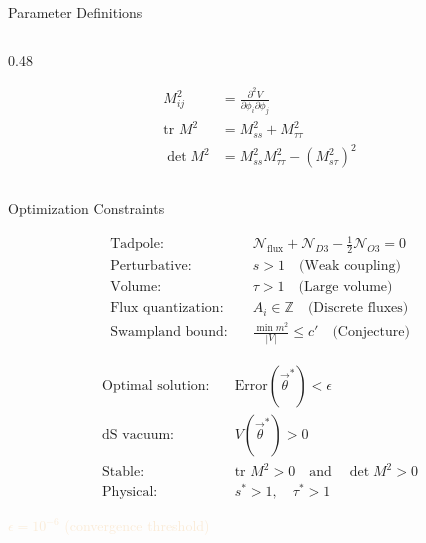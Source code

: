 \begin{frame}{Parameter Definitions}
\begin{columns}
\begin{column}{0.48\textwidth}
\vspace{0.3cm}

\begin{tcolorbox}[
    enhanced,
    colback=black!85,
    colframe=Red!80!white,
    arc=3mm,
    boxrule=1pt,
    title={\color{Yellow!80!white}Mass Matrix Components}
]
\begin{align*}
M^2_{ij} &= \frac{\partial^2 V}{\partial \phi_i \partial \phi_j} \\
\text{tr } M^2 &= M^2_{ss} + M^2_{\tau\tau} \\
\det M^2 &= M^2_{ss}M^2_{\tau\tau} - (M^2_{s\tau})^2
\end{align*}
\end{tcolorbox}
\end{column}
\end{columns}
\end{frame}

\begin{frame}{Optimization Constraints}
\blurbackground
\begin{tcolorbox}[
    enhanced,
    colback=black!85,
    colframe=Yellow!80!white,
    arc=3mm,
    boxrule=1.5pt,
    title={\color{mypurple}Physical Constraints}
]
\begin{align*}
\text{Tadpole:} \quad & \mathcal{N}_{\text{flux}} + \mathcal{N}_{D3} - \frac{1}{2}\mathcal{N}_{O3} = 0 \\
\text{Perturbative:} \quad & s > 1 \quad \text{(Weak coupling)} \\
\text{Volume:} \quad & \tau > 1 \quad \text{(Large volume)} \\
\text{Flux quantization:} \quad & A_i \in \mathbb{Z} \quad \text{(Discrete fluxes)} \\
\text{Swampland bound:} \quad & \frac{\min m^2}{|V|} \leq c' \quad \text{(Conjecture)}
\end{align*}
\end{tcolorbox}

\vspace{0.3cm}

\begin{tcolorbox}[
    enhanced,
    colback=black!85,
    colframe=LimeGreen,
    arc=3mm,
    boxrule=1.5pt,
    title={\color{mypurple}Success Criteria}
]
\begin{align*}
\text{Optimal solution:} \quad & \text{Error}(\vec{\theta}^*) < \epsilon \\
\text{dS vacuum:} \quad & V(\vec{\theta}^*) > 0 \\
\text{Stable:} \quad & \text{tr } M^2 > 0 \quad \text{and} \quad \det M^2 > 0 \\
\text{Physical:} \quad & s^* > 1, \quad \tau^* > 1
\end{align*}
\vspace{-0.2cm}
\begin{flushright}
\textcolor{AntiqueWhite}{$\epsilon = 10^{-6}$ (convergence threshold)}
\end{flushright}
\end{tcolorbox}
\end{frame}

